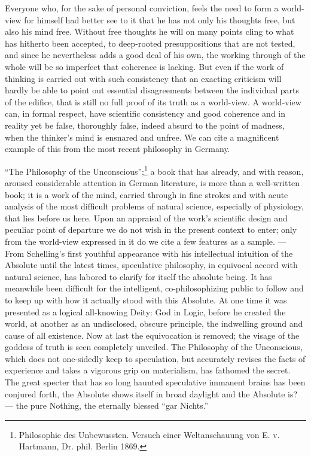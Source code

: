 \documentclass[12pt,a4paper,openany]{book}
\newcommand{\opage}[1]{\marginnote{\footnotesize\textit{[#1]}}}
\begin{document}
Everyone who, for the sake of personal conviction,
feels the need to form a world-view for himself had better
see to it that he has not only his thoughts free, but also his mind
free. Without free thoughts he will on many points
cling to what has hitherto been accepted, to deep-rooted presuppositions
that are not tested, and since he nevertheless adds a good deal
of his own, the working through of the whole
will be so imperfect that coherence is lacking.
But even if the work of thinking is carried out with such
consistency that an exacting criticism will hardly
be able to point out essential disagreements between the individual
parts of the edifice, that is still no full proof
of its truth as a world-view. A world-view
can, in formal respect, have scientific
consistency and good coherence and in reality yet
be false, thoroughly false, indeed absurd to the point of madness,
\setcounter{footnote}{0}%
\opage{12}when the thinker's mind is ensnared and unfree. We can cite
a magnificent example of this from the most recent philosophy in
Germany.

``The Philosophy of the Unconscious'';\footnote[1]{Philosophie des Unbewussten. Versuch einer Weltanschauung von E. v. Hartmann, Dr. phil. Berlin 1869.} a book that has already, and
with reason, aroused considerable attention in
German literature, is more than a well-written book; it
is a work of the mind, carried through in fine strokes and with acute analysis of the
most difficult problems of natural science,
especially of physiology, that lies before us here. Upon
an appraisal of the work's scientific design and peculiar
point of departure we do not wish in the present context
to enter; only from the world-view expressed
in it do we cite a few features as a sample. --- From
Schelling's first youthful appearance with his
intellectual intuition of the Absolute until the latest
times, speculative philosophy, in equivocal accord
with natural science, has labored to clarify for itself the absolute
being. It has meanwhile been difficult for the intelligent, co-philosophizing
public to follow and to keep up with
how it actually stood with this Absolute.
At one time it was presented as a logical all-knowing
Deity: God in Logic, before he created the world,
at another as an undisclosed, obscure principle, the indwelling
ground and cause of all existence. Now at last
the equivocation is removed; the visage of the goddess of truth is seen completely
unveiled. The Philosophy of the Unconscious, which does not one-sidedly
keep to speculation, but accurately revises the facts of
experience and takes a vigorous grip on
\setcounter{footnote}{0}%
\opage{13}materialism, has fathomed the secret. The great
specter that has so long haunted speculative immanent
brains has been conjured forth, the Absolute shows itself in
broad daylight and the Absolute is? --- the pure Nothing, the
eternally blessed ``gar Nichts.''
\end{document}

